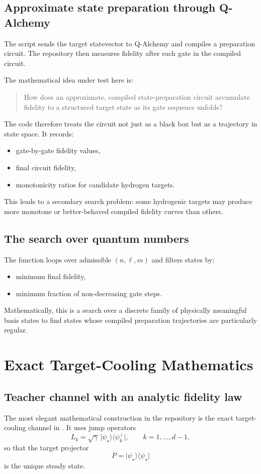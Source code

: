 \documentclass[11pt,a4paper]{article}
\begin{document}
\subsection{Approximate state preparation through Q-Alchemy}
The script  sends the target statevector to Q-Alchemy and compiles a preparation circuit. The repository then measures fidelity after each gate in the compiled circuit.

The mathematical idea under test here is:
\begin{quote}
How does an approximate, compiled state-preparation circuit accumulate fidelity to a structured target state as its gate sequence unfolds?
\end{quote}

The code therefore treats the circuit not just as a black box but as a trajectory in state space. It records:
\begin{itemize}
  \item gate-by-gate fidelity values,
  \item final circuit fidelity,
  \item monotonicity ratios for candidate hydrogen targets.
\end{itemize}

This leads to a secondary search problem: some hydrogenic targets may produce more monotone or better-behaved compiled fidelity curves than others.

\subsection{The search over quantum numbers}
The function  loops over admissible $(n,\ell,m)$ and filters states by:
\begin{itemize}
  \item minimum final fidelity,
  \item minimum fraction of non-decreasing gate steps.
\end{itemize}
Mathematically, this is a search over a discrete family of physically meaningful basis states to find states whose compiled preparation trajectories are particularly regular.

\section{Exact Target-Cooling Mathematics}

\subsection{Teacher channel with an analytic fidelity law}
The most elegant mathematical construction in the repository is the exact target-cooling channel in . It uses jump operators
\[
L_k = \sqrt{\gamma}\,\lvert \psi_\star\rangle \langle \psi_k^\perp\rvert,
\qquad k=1,\dots,d-1,
\]
so that the target projector
\[
P = \lvert \psi_\star\rangle \langle \psi_\star\rvert
\]
is the unique steady state.
\end{document}
